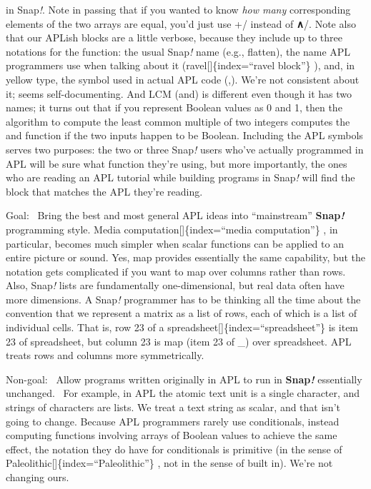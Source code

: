 \documentclass[
  letterpaper,
]{book}
\begin{document}
in Snap\emph{!}. Note in passing that if you wanted to know \emph{how
many} corresponding elements of the two arrays are equal, you'd just use
+/ instead of \textbf{∧}/. Note also that our APLish blocks are a little
verbose, because they include up to three notations for the function:
the usual Snap\emph{!} name (e.g., flatten), the name APL programmers
use when talking about it (ravel{[}{]}\{index=``ravel block''\} ), and,
in yellow type, the symbol used in actual APL code (,). We're not
consistent about it; seems self-documenting. And LCM (and) is different
even though it has two names; it turns out that if you represent Boolean
values as 0 and 1, then the algorithm to compute the least common
multiple of two integers computes the and function if the two inputs
happen to be Boolean. Including the APL symbols serves two purposes: the
two or three Snap\emph{!} users who've actually programmed in APL will
be sure what function they're using, but more importantly, the ones who
are reading an APL tutorial while building programs in Snap\emph{!} will
find the block that matches the APL they're reading.

Goal:~ Bring the best and most general APL ideas into ``mainstream''
\textbf{Snap\emph{!}} programming style. Media
computation{[}{]}\{index=``media computation''\} , in particular,
becomes much simpler when scalar functions can be applied to an entire
picture or sound. Yes, map provides essentially the same capability, but
the notation gets complicated if you want to map over columns rather
than rows. Also, Snap\emph{!} lists are fundamentally one-dimensional,
but real data often have more dimensions. A Snap\emph{!} programmer has
to be thinking all the time about the convention that we represent a
matrix as a list of rows, each of which is a list of individual cells.
That is, row 23 of a spreadsheet{[}{]}\{index=``spreadsheet''\} is item
23 of spreadsheet, but column 23 is map (item 23 of \_) over
spreadsheet. APL treats rows and columns more symmetrically.

Non-goal:~ Allow programs written originally in APL to run in
\textbf{Snap\emph{!}} essentially unchanged.~ For example, in APL the
atomic text unit is a single character, and strings of characters are
lists. We treat a text string as scalar, and that isn't going to change.
Because APL programmers rarely use conditionals, instead computing
functions involving arrays of Boolean values to achieve the same effect,
the notation they do have for conditionals is primitive (in the sense of
Paleolithic{[}{]}\{index=``Paleolithic''\} , not in the sense of built
in). We're not changing ours.
\end{document}
